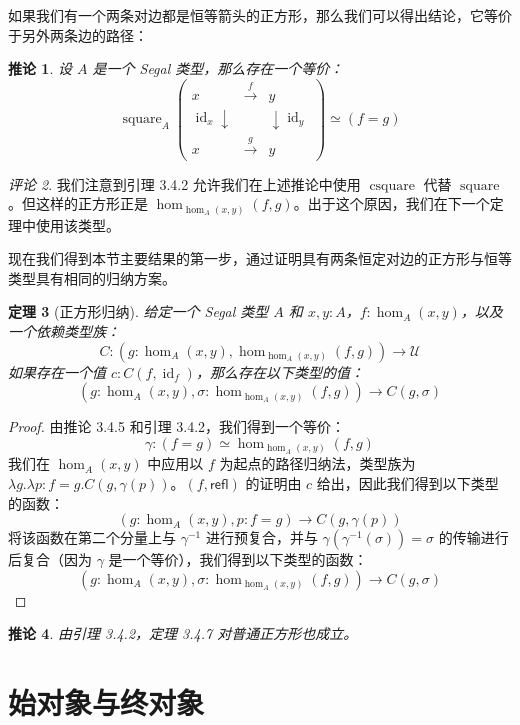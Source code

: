 \documentclass{ctexrep}
\theoremstyle{plain}
\newtheorem{theorem}{定理}[section]
\newtheorem{corollary}[theorem]{推论}
\theoremstyle{definition}
\theoremstyle{remark}
\newtheorem{remark}[theorem]{评论}
\theoremstyle{definition}
\theoremstyle{definition}
\theoremstyle{definition}
\newcommand{\refl}{\mathsf{refl}}
\newcommand{\id}{\operatorname{id}}
\newcommand{\UU}{\mathcal{U}}
\newcommand{\square}{\operatorname{square}}
\newcommand{\csquare}{\operatorname{csquare}}
\begin{document}
如果我们有一个两条对边都是恒等箭头的正方形，那么我们可以得出结论，它等价于另外两条边的路径：

\begin{corollary}
设 $A$ 是一个 Segal 类型，那么存在一个等价：
\[
\square_A\left( \begin{array}{ccc}
x & \xrightarrow{f} & y \\
\id_x\downarrow & & \downarrow \id_y \\
x & \xrightarrow{g} & y
\end{array} \right) \simeq (f=g)
\]
\end{corollary}

\begin{remark}
我们注意到引理 3.4.2 允许我们在上述推论中使用 $\csquare$ 代替 $\square$。但这样的正方形正是 $\hom_{\hom_A(x,y)}(f,g)$。出于这个原因，我们在下一个定理中使用该类型。
\end{remark}

现在我们得到本节主要结果的第一步，通过证明具有两条恒定对边的正方形与恒等类型具有相同的归纳方案。

\begin{theorem}[正方形归纳]
给定一个 Segal 类型 $A$ 和 $x,y:A$，$f:\hom_A(x,y)$，以及一个依赖类型族：
\[
C : (g:\hom_A(x,y), \hom_{\hom_A(x,y)}(f,g)) \to \UU
\]
如果存在一个值 $c:C(f,\id_f)$，那么存在以下类型的值：
\[
\left(g:\hom_A(x,y),\sigma :\hom_{\hom_A(x,y)}(f,g)\right) \to C(g,\sigma)
\]
\end{theorem}

\begin{proof}
由推论 3.4.5 和引理 3.4.2，我们得到一个等价：
\[
\gamma : (f = g) \simeq \hom_{\hom_A(x,y)}(f,g)
\]
我们在 $\hom_A(x,y)$ 中应用以 $f$ 为起点的路径归纳法，类型族为 $\lambda g.\lambda p:f=g. C(g,\gamma(p))$。$(f,\refl)$ 的证明由 $c$ 给出，因此我们得到以下类型的函数：
\[
(g:\hom_A(x,y), p:f=g) \to C(g,\gamma(p))
\]
将该函数在第二个分量上与 $\gamma^{-1}$ 进行预复合，并与 $\gamma(\gamma^{-1}(\sigma)) = \sigma$ 的传输进行后复合（因为 $\gamma$ 是一个等价），我们得到以下类型的函数：
\[
\left(g:\hom_A(x,y),\sigma :\hom_{\hom_A(x,y)}(f,g)\right) \to C(g,\sigma)
\]
\end{proof}

\begin{corollary}
由引理 3.4.2，定理 3.4.7 对普通正方形也成立。
\end{corollary}

\section{始对象与终对象}
\end{document}

